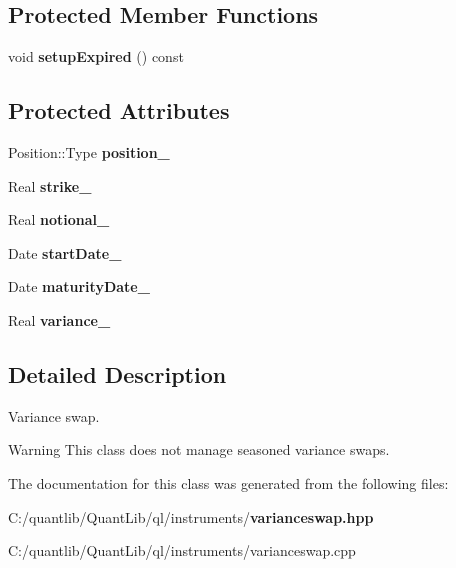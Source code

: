 \subsection*{Protected Member Functions}
\begin{DoxyCompactItemize}
\item 
void {\bfseries setup\+Expired} () const \label{class_quant_lib_1_1_variance_swap_a97e3b12366697ef72b5741247b1af466}

\end{DoxyCompactItemize}
\subsection*{Protected Attributes}
\begin{DoxyCompactItemize}
\item 
Position\+::\+Type {\bfseries position\+\_\+}\label{class_quant_lib_1_1_variance_swap_a98e3c22aa7d2d65a8b75502ba497dc38}

\item 
Real {\bfseries strike\+\_\+}\label{class_quant_lib_1_1_variance_swap_aa09f8fc8005c75dc3617dc17abfe9fce}

\item 
Real {\bfseries notional\+\_\+}\label{class_quant_lib_1_1_variance_swap_accfc43cf3264a24cd5b5d1cfbb915210}

\item 
Date {\bfseries start\+Date\+\_\+}\label{class_quant_lib_1_1_variance_swap_a2f67896d683f2fd913c9f0ba4020a612}

\item 
Date {\bfseries maturity\+Date\+\_\+}\label{class_quant_lib_1_1_variance_swap_aeeb7150d864372e0a7104ba76b77dd61}

\item 
Real {\bfseries variance\+\_\+}\label{class_quant_lib_1_1_variance_swap_ad36c9a795be552c19bb848119b2db64d}

\end{DoxyCompactItemize}


\subsection{Detailed Description}
Variance swap. 

\begin{DoxyWarning}{Warning}
This class does not manage seasoned variance swaps. 
\end{DoxyWarning}


The documentation for this class was generated from the following files\+:\begin{DoxyCompactItemize}
\item 
C\+:/quantlib/\+Quant\+Lib/ql/instruments/{\bf varianceswap.\+hpp}\item 
C\+:/quantlib/\+Quant\+Lib/ql/instruments/varianceswap.\+cpp\end{DoxyCompactItemize}
